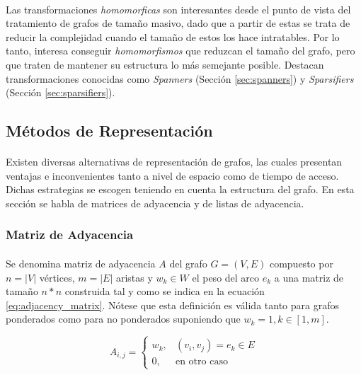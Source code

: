 \documentclass{subfiles}
\begin{document}
      \paragraph{}
      Las transformaciones \emph{homomorficas} son interesantes desde el punto de vista del tratamiento de grafos de tamaño masivo, dado que a partir de estas se trata de reducir la complejidad cuando el tamaño de estos los hace intratables. Por lo tanto, interesa conseguir \emph{homomorfismos} que reduzcan el tamaño del grafo, pero que traten de mantener su estructura lo más semejante posible. Destacan transformaciones conocidas como \emph{Spanners} (Sección \ref{sec:spanners}) y \emph{Sparsifiers} (Sección \ref{sec:sparsifiers}).

      \subsection{Métodos de Representación}
      \label{sec:laplacian_matrix}

        \paragraph{}
        Existen diversas alternativas de representación de grafos, las cuales presentan ventajas e inconvenientes tanto a nivel de espacio como de tiempo de acceso. Dichas estrategias se escogen teniendo en cuenta la estructura del grafo. En esta sección se habla de matrices de adyacencia y de listas de adyacencia.

        \subsubsection{Matriz de Adyacencia}
        \label{sec:adjacency_matrix}

          \paragraph{}
          Se denomina matriz de adyacencia $A$ del grafo $G = (V,E)$ compuesto por $n=|V|$ vértices, $m=|E|$ aristas y $w_k \in W$ el peso del arco $e_k$ a una matriz de tamaño $n*n$ construida tal y como se indica en la ecuación \eqref{eq:adjacency_matrix}. Nótese que esta definición es válida tanto para grafos ponderados como para no ponderados suponiendo que $w_k = 1, k \in [1, m]$.

          \begin{equation}
          \label{eq:adjacency_matrix}
            A_{i,j} =
              \begin{cases}
                w_k,  & (v_i, v_j) = e_k \in E\\
                0,    &\text{en otro caso}
              \end{cases}
          \end{equation}
\end{document}
